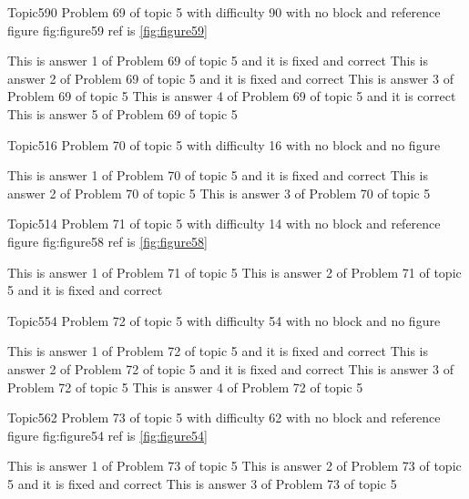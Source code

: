\documentclass[master]{exam}
\begin{document}
\begin{problem}{Topic5}{90}
	Problem 69 of topic 5 with difficulty 90 with no block and reference figure fig:figure59 ref is \ref{fig:figure59}
	\begin{answers}
		 This is answer 1 of Problem 69 of topic 5 and it is fixed and correct
		 This is answer 2 of Problem 69 of topic 5 and it is fixed and correct
		\answer This is answer 3 of Problem 69 of topic 5 
		\answer[correct] This is answer 4 of Problem 69 of topic 5 and it is correct
		\answer This is answer 5 of Problem 69 of topic 5 
	\end{answers}
\end{problem}

\begin{problem}{Topic5}{16}
	Problem 70 of topic 5 with difficulty 16 with no block and no figure
	\begin{answers}
		 This is answer 1 of Problem 70 of topic 5 and it is fixed and correct
		\answer This is answer 2 of Problem 70 of topic 5 
		\answer This is answer 3 of Problem 70 of topic 5 
	\end{answers}
\end{problem}

\begin{problem}{Topic5}{14}
	Problem 71 of topic 5 with difficulty 14 with no block and reference figure fig:figure58 ref is \ref{fig:figure58}
	\begin{answers}
		\answer This is answer 1 of Problem 71 of topic 5 
		 This is answer 2 of Problem 71 of topic 5 and it is fixed and correct
	\end{answers}
\end{problem}

\begin{problem}{Topic5}{54}
	Problem 72 of topic 5 with difficulty 54 with no block and no figure
	\begin{answers}
		 This is answer 1 of Problem 72 of topic 5 and it is fixed and correct
		 This is answer 2 of Problem 72 of topic 5 and it is fixed and correct
		\answer This is answer 3 of Problem 72 of topic 5 
		\answer This is answer 4 of Problem 72 of topic 5 
	\end{answers}
\end{problem}

\begin{problem}{Topic5}{62}
	Problem 73 of topic 5 with difficulty 62 with no block and reference figure fig:figure54 ref is \ref{fig:figure54}
	\begin{answers}
		\answer This is answer 1 of Problem 73 of topic 5 
		 This is answer 2 of Problem 73 of topic 5 and it is fixed and correct
		\answer This is answer 3 of Problem 73 of topic 5 
	\end{answers}
\end{problem}
\end{document}
